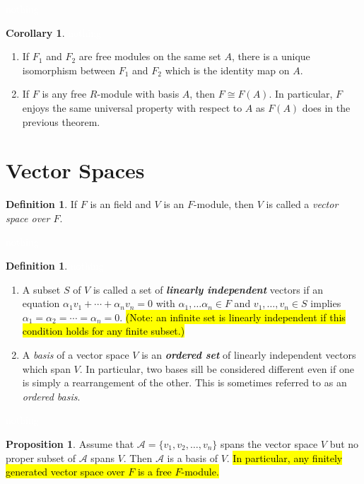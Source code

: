 \documentclass{article}
\theoremstyle{definition}
\newtheorem{prop}[thm]{Proposition}
\newtheorem{cor}[thm]{Corollary}
\newtheorem{defn}[thm]{Definition}
\newcommand{\nl}{\textcolor{white}{nothing}}
\newcommand{\al}{\alpha}
\newcommand{\A}{\mathcal{A}}
\begin{document}
\nl

\begin{cor}\nl
\begin{enumerate}
\item If $F_1$ and $F_2$ are free modules on the same set $A$, there is a unique isomorphism between $F_1$ and $F_2$ which is the identity map on $A$.
\item If $F$ is any free $R$-module with basis $A$, then $F\cong F(A)$. In particular, $F$ enjoys the same universal property with respect to $A$ as $F(A)$ does in the previous theorem.
\end{enumerate}
\end{cor}



\section{Vector Spaces}
\setcounter{thm}{0}

\begin{defn}
If $F$ is an field and $V$ is an $F$-module, then $V$ is called a \textit{vector space over $F$}.
\end{defn}

\nl

\begin{defn}\nl
\begin{enumerate}
\item A subset $S$ of $V$ is called a set of \textbf{\textit{linearly independent}} vectors if an equation $\al_1v_1+\cdots +\al_nv_n = 0$ with $\al_1,\ldots \al_n\in F$ and $v_1,\ldots, v_n\in S$ implies $\al_1 = \al_2 = \cdots = \al_n = 0$. \hl{(Note: an infinite set is linearly independent if this condition holds for any finite subset.)}
\item A \textit{basis} of a vector space $V$ is an \textbf{\textit{ordered set}} of linearly independent vectors which span $V$. In particular, two bases sill be considered different even if one is simply a rearrangement of the other. This is sometimes referred to as an \textit{ordered basis}.
\end{enumerate}
\end{defn}

\nl

\begin{prop}
Assume that $\A = \{v_1,v_2,\ldots, v_n\}$ spans the vector space $V$ but no proper subset of $\A$ spans $V$. Then $\A$ is a basis of $V$. \hl{In particular, any finitely generated vector space over $F$ is a free $F$-module.}
\end{prop}
\end{document}
